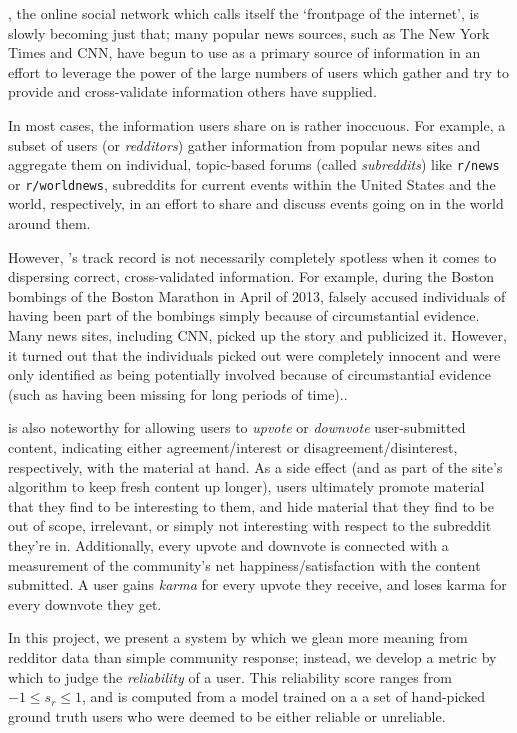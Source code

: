 \reddit{}, the online social network which calls itself the `frontpage of the
internet', is slowly becoming just that; many popular news sources, such as The
New York Times and CNN, have begun to use \reddit{} as a primary source of
information in an effort to leverage the power of the large numbers of users
which gather and try to provide and cross-validate information others have
supplied.

In most cases, the information users share on \reddit{} is rather inoccuous. For
example, a subset of \reddit{} users (or \textit{redditors}) gather information
from popular news sites and aggregate them on individual, topic-based forums
(called \textit{subreddits}) like \texttt{r/news} or \texttt{r/worldnews},
subreddits for current events within the United States and the world,
respectively, in an effort to share and discuss events going on in the world
around them.

However, \reddit{}'s track record is not necessarily completely spotless when it
comes to dispersing correct, cross-validated information. For example, during
the Boston bombings of the Boston Marathon in April of 2013, \reddit{} falsely
accused individuals of having been part of the bombings simply because of
circumstantial evidence. Many news sites, including CNN, picked up the story and
publicized it. However, it turned out that the individuals \reddit{} picked out
were completely innocent and were only identified as being potentially involved
because of circumstantial evidence (such as having been missing for long periods
of time).\cite{Potts:2013:IRC:2507065.2507079}.

\reddit{} is also noteworthy for allowing users to \textit{upvote} or
\textit{downvote} user-submitted content, indicating either agreement/interest
or disagreement/disinterest, respectively, with the material at hand. As a side
effect (and as part of the site's algorithm to keep fresh content up longer),
users ultimately promote material that they find to be interesting to them, and
hide material that they find to be out of scope, irrelevant, or simply not
interesting with respect to the subreddit they're
in.\cite{Gilbert:2013:WUR:2441776.2441866} Additionally, every upvote and
downvote is connected with a measurement of the community's net
happiness/satisfaction with the content submitted. A user gains \textit{karma}
for every upvote they receive, and loses karma for every downvote they get.

In this project, we present a system by which we glean more meaning from
redditor data than simple community response; instead, we develop a metric by
which to judge the \textit{reliability} of a user. This reliability score ranges
from $-1 \leq s_r \leq 1$, and is computed from a model trained on a a set of
hand-picked ground truth users who were deemed to be either reliable or
unreliable.
